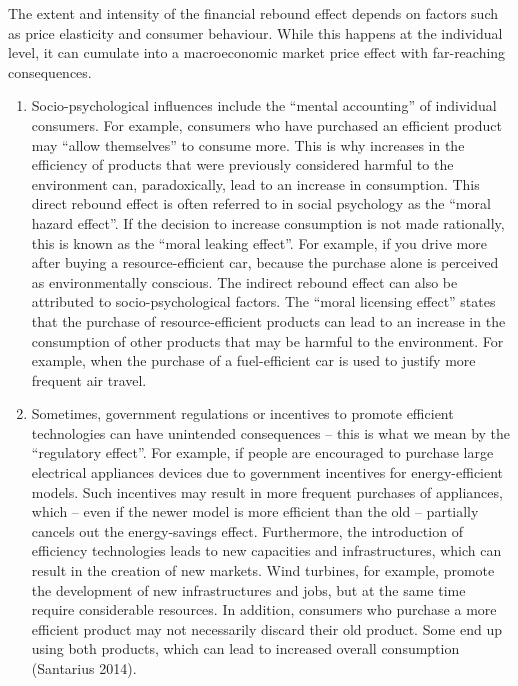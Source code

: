 \documentclass[
  a4paper,
  openany]{book}
\begin{document}
The extent and intensity of the financial rebound effect depends on
factors such as price elasticity and consumer behaviour. While this
happens at the individual level, it can cumulate into a macroeconomic
market price effect with far-reaching consequences.

\begin{enumerate}
\def\labelenumi{\arabic{enumi}.}
\setcounter{enumi}{1}
\item
  Socio-psychological influences include the ``mental accounting'' of
  individual consumers. For example, consumers who have purchased an
  efficient product may ``allow themselves'' to consume more. This is
  why increases in the efficiency of products that were previously
  considered harmful to the environment can, paradoxically, lead to an
  increase in consumption. This direct rebound effect is often referred
  to in social psychology as the ``moral hazard effect''. If the
  decision to increase consumption is not made rationally, this is known
  as the ``moral leaking effect''. For example, if you drive more after
  buying a resource-efficient car, because the purchase alone is
  perceived as environmentally conscious. The indirect rebound effect
  can also be attributed to socio-psychological factors. The ``moral
  licensing effect'' states that the purchase of resource-efficient
  products can lead to an increase in the consumption of other products
  that may be harmful to the environment. For example, when the purchase
  of a fuel-efficient car is used to justify more frequent air travel.
\item
  Sometimes, government regulations or incentives to promote efficient
  technologies can have unintended consequences -- this is what we mean
  by the ``regulatory effect''. For example, if people are encouraged to
  purchase large electrical appliances devices due to government
  incentives for energy-efficient models. Such incentives may result in
  more frequent purchases of appliances, which -- even if the newer
  model is more efficient than the old -- partially cancels out the
  energy-savings effect. Furthermore, the introduction of efficiency
  technologies leads to new capacities and infrastructures, which can
  result in the creation of new markets. Wind turbines, for example,
  promote the development of new infrastructures and jobs, but at the
  same time require considerable resources. In addition, consumers who
  purchase a more efficient product may not necessarily discard their
  old product. Some end up using both products, which can lead to
  increased overall consumption (Santarius 2014).
\end{enumerate}
\end{document}
